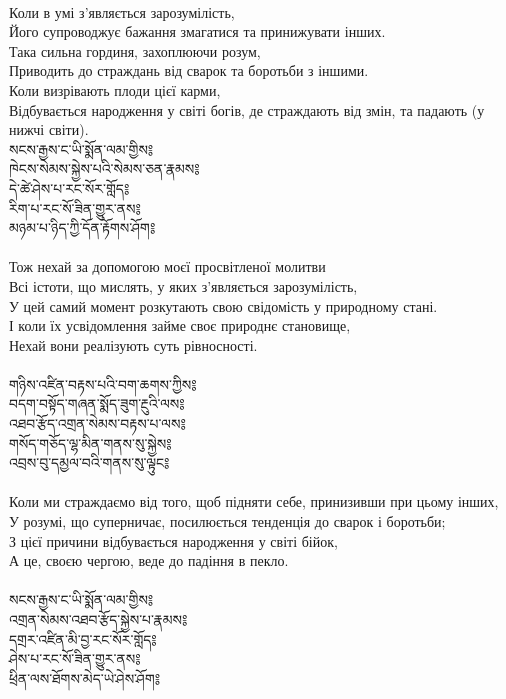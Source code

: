 \\
Коли в умі з'являється зарозумілість, \\
Його супроводжує бажання змагатися та принижувати інших. \\
Така сильна гординя, захоплюючи розум, \\
Приводить до страждань від сварок та боротьби з іншими. \\
Коли визрівають плоди цієї карми, \\
Відбувається народження у світі богів, де страждають від змін, та падають (у нижчі світи). \\
{\ti
སངས་རྒྱས་ང་ཡི་སྨོན་ལམ་གྱིས༔ \\
ཁེངས་སེམས་སྐྱེས་པའི་སེམས་ཅན་རྣམས༔ \\
དེ་ཚེ་ཤེས་པ་རང་སོར་གློད༔ \\
རིག་པ་རང་སོ་ཟིན་གྱུར་ནས༔ \\
མཉམ་པ་ཉིད་ཀྱི་དོན་རྟོགས་ཤོག༔}\\
\\
Тож нехай за допомогою моєї просвітленої молитви \\
Всі істоти, що мислять, у яких з'являється зарозумілість, \\
У цей самий момент розкутають свою свідомість у природному стані. \\
І коли їх усвідомлення займе своє природнє становище, \\
Нехай вони реалізують суть рівносності. \\
\\
\newpage
{\ti
གཉིས་འཛིན་བརྟས་པའི་བག་ཆགས་ཀྱིས༔ \\
བདག་བསྟོད་གཞན་སྨོད་ཟུག་རྔུའི་ལས༔ \\
འཐབ་རྩོད་འགྲན་སེམས་བརྟས་པ་ལས༔ \\
གསོད་གཅོད་ལྷ་མིན་གནས་སུ་སྐྱེས༔ \\
འབྲས་བུ་དམྱལ་བའི་གནས་སུ་ལྟུང༔}\\
\\
Коли ми страждаємо від того, щоб підняти себе, принизивши при цьому інших, \\
У розумі, що суперничає, посилюється тенденція до сварок і боротьби; \\
З цієї причини відбувається народження у світі бійок, \\
А це, своєю чергою, веде до падіння в пекло. \\
\\
{\ti
སངས་རྒྱས་ང་ཡི་སྨོན་ལམ་གྱིས༔ \\
འགྲན་སེམས་འཐབ་རྩོད་སྐྱེས་པ་རྣམས༔ \\
དགྲར་འཛིན་མི་བྱ་རང་སོར་གློད༔ \\
ཤེས་པ་རང་སོ་ཟིན་གྱུར་ནས༔ \\
ཕྲིན་ལས་ཐོགས་མེད་ཡེ་ཤེས་ཤོག༔}\\
